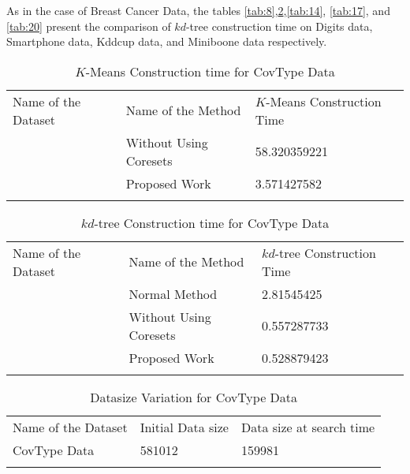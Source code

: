 \documentclass[runningheads]{llncs}
\begin{document}
As in the case of Breast Cancer Data, the tables \ref{tab:8},\ref{tab:11},\ref{tab:14}, \ref{tab:17}, and \ref{tab:20} present the comparison of $kd$-tree construction time on Digits data, Smartphone data, Kddcup data, and Miniboone data respectively.


\begin{table}[!hbt]
	\caption{$K$-Means Construction time for CovType Data}
	\label{tab:12}       %
	\begin{tabular}{p{3cm}p{4cm}p{3.4cm}}
		\hline\noalign{\smallskip}
		Name of the Dataset & Name of the Method & $K$-Means Construction Time  \\
		\noalign{\smallskip}\hline\noalign{\smallskip}
		\multirow{2}{*}{CovType Data} & Without Using Coresets & 58.320359221\\
		& Proposed Work  & 3.571427582\\
		\noalign{\smallskip}\hline\noalign{\smallskip}
	\end{tabular}
\end{table}
\begin{table}[!hbt]
	\caption{$kd$-tree Construction time for CovType Data}
	\label{tab:11}       %
	\begin{tabular}{p{3cm}p{4cm}p{3.4cm}}
		\hline\noalign{\smallskip}
		Name of the Dataset & Name of the Method & $kd$-tree Construction Time  \\
		\noalign{\smallskip}\hline\noalign{\smallskip}
		\multirow{3}{*}{CovType Data} & Normal Method  & 2.81545425\\
		& Without Using Coresets & 0.557287733\\
		& Proposed Work  & 0.528879423\\
		\noalign{\smallskip}\hline\noalign{\smallskip}
	\end{tabular}
\end{table}	
\begin{table}[!hbt]
	\caption{Datasize Variation for CovType Data}
	\label{tab:13}       %
	\begin{tabular}{p{3cm}p{4cm}p{3.4cm}}
		\hline\noalign{\smallskip}
		Name of the Dataset & Initial Data size & Data size at search time  \\
		\noalign{\smallskip}\hline\noalign{\smallskip}
		CovType Data& 581012  & 159981 \\
		\noalign{\smallskip}\hline\noalign{\smallskip}
	\end{tabular}
\end{table}
\end{document}
